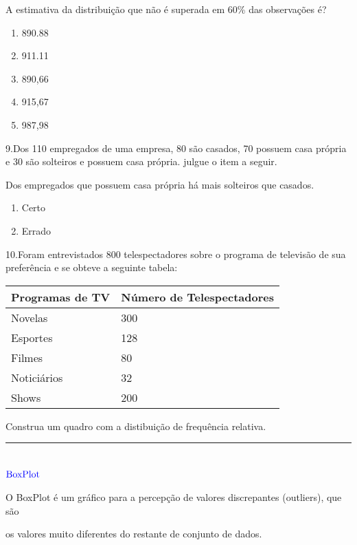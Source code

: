 \documentclass[]{book}
\begin{document}
A estimativa da distribuição que não é superada em 60\% das observações é?

\begin{enumerate}
\def\labelenumi{\Alph{enumi})}
\item
  890.88
\item
  911.11
\item
  890,66
\item
  915,67
\item
  987,98
\end{enumerate}

9.Dos 110 empregados de uma empresa, 80 são casados, 70 possuem casa própria e 30 são solteiros e possuem casa própria. julgue o item a seguir.

Dos empregados que possuem casa própria há mais solteiros que casados.

\begin{enumerate}
\def\labelenumi{\Alph{enumi})}
\item
  Certo
\item
  Errado
\end{enumerate}

10.Foram entrevistados 800 telespectadores sobre o programa de televisão de sua preferência e se obteve a seguinte tabela:

\begin{longtable}[]{@{}ll@{}}
\toprule
Programas de TV & Número de Telespectadores\tabularnewline
\midrule
\endhead
Novelas & 300\tabularnewline
Esportes & 128\tabularnewline
Filmes & 80\tabularnewline
Noticiários & 32\tabularnewline
Shows & 200\tabularnewline
\bottomrule
\end{longtable}

Construa um quadro com a distibuição de frequência relativa.

\begin{center}\rule{0.5\linewidth}{\linethickness}\end{center}

\hypertarget{colorbluetextboxplot}{%
\chapter{\texorpdfstring{\(\color{blue}{\text{BoxPlot}}\)}{\textbackslash{}color\{blue\}\{\textbackslash{}text\{BoxPlot\}\}}}\label{colorbluetextboxplot}}

O BoxPlot é um gráfico para a percepção de valores discrepantes (outliers), que são

os valores muito diferentes do restante de conjunto de dados.
\end{document}
